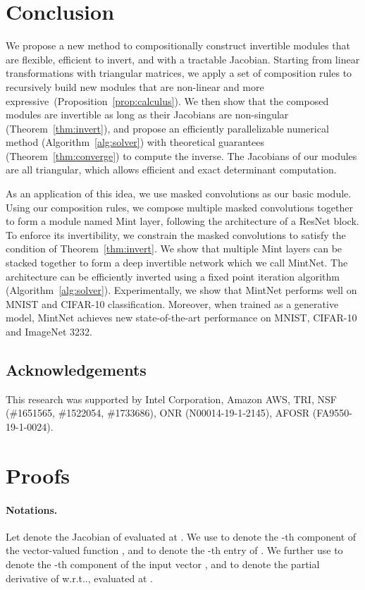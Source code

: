 \documentclass{article}
\makeatletter
\def\@onedot{\ifx\@let@token.\else.\null\fi\xspace}
\DeclareRobustCommand\onedot{\futurelet\@let@token\@onedot}
\newcommand{\algoref}[1]{Algorithm~\ref{#1}}
\newcommand{\thmref}[1]{Theorem~\ref{#1}}
\newcommand{\propref}[1]{Proposition~\ref{#1}}
\def\wrt{w.r.t\onedot}
\makeatother
\begin{document}
 \section{Conclusion}
We propose a new method to compositionally construct invertible modules that are flexible, efficient to invert, and with a tractable Jacobian. Starting from linear transformations with triangular matrices, we apply a set of composition rules to recursively build new modules that are non-linear and more expressive~(\propref{prop:calculus}). We then show that the composed modules are invertible as long as their Jacobians are non-singular (\thmref{thm:invert}), and propose an efficiently parallelizable numerical method (\algoref{alg:solver}) with theoretical guarantees (\thmref{thm:converge}) to compute the inverse. The Jacobians of our modules are all triangular, which allows efficient and exact determinant computation.

As an application of this idea, we use masked convolutions as our basic module. Using our composition rules, we compose multiple masked convolutions together to form a module named Mint layer, following the architecture of a ResNet block. To enforce its invertibility, we constrain the masked convolutions to satisfy the condition of \thmref{thm:invert}. We show that multiple Mint layers can be stacked together to form a deep invertible network which we call MintNet. The architecture can be efficiently inverted using a fixed point iteration algorithm (\algoref{alg:solver}). Experimentally, we show that MintNet performs well on MNIST and CIFAR-10 classification. Moreover, when trained as a generative model, MintNet achieves new state-of-the-art performance on MNIST, CIFAR-10 and ImageNet 3232.

\subsection*{Acknowledgements}
This research was supported by Intel Corporation, Amazon AWS, TRI, NSF (\#1651565, \#1522054, \#1733686), ONR  (N00014-19-1-2145), AFOSR (FA9550-
19-1-0024).





 
\newpage
\appendix
\section{Proofs}\label{app:proof}
\paragraph{Notations.} Let  denote the Jacobian of  evaluated at . We use  to denote the -th component of the vector-valued function , and  to denote the -th entry of . We further use  to denote the -th component of the input vector , and  to denote the partial derivative of  \wrt , evaluated at .
\end{document}
